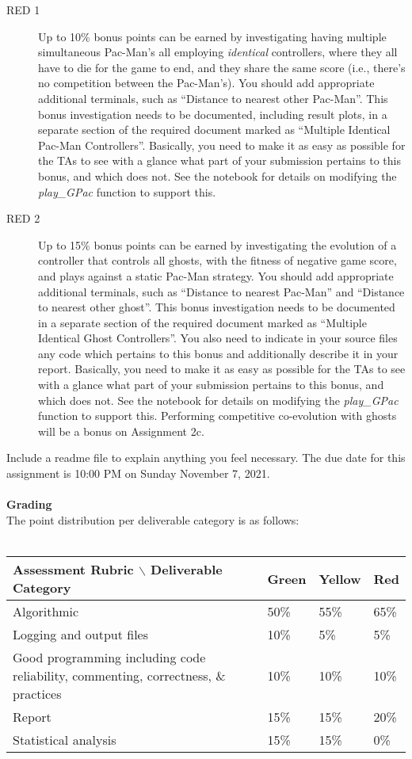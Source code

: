 \documentclass{article}
\begin{document}
\begin{description}
\item[RED 1] Up to 10\% bonus points can be earned by investigating having multiple simultaneous Pac-Man's all employing \emph{identical} controllers, where they all have to die for the game to end, and they share the same score (i.e., there's no competition between the Pac-Man's). You should add appropriate additional terminals, such as ``Distance to nearest other Pac-Man''. This bonus investigation needs to be documented, including result plots, in a separate section of the required document marked as ``Multiple Identical Pac-Man Controllers''. Basically, you need to make it as easy as possible for the TAs to see with a glance what part of your submission pertains to this bonus, and which does not. See the notebook for details on modifying the \emph{play\_GPac} function to support this.
\item[RED 2] Up to 15\% bonus points can be earned by investigating the evolution of a controller that controls all ghosts, with the fitness of negative game score, and plays against a static Pac-Man strategy. You should add appropriate additional terminals, such as ``Distance to nearest Pac-Man'' and ``Distance to nearest other ghost''. This bonus investigation needs to be documented in a separate section of the required document marked as ``Multiple Identical Ghost Controllers''. You also need to indicate in your source files any code which pertains to this bonus and additionally describe it in your report. Basically, you need to make it as easy as possible for the TAs to see with a glance what part of your submission pertains to this bonus, and which does not. See the notebook for details on modifying the \emph{play\_GPac} function to support this. Performing competitive co-evolution with ghosts will be a bonus on Assignment 2c.

\end{description}
Include a readme file to explain anything you feel necessary. The due date for this assignment is 10:00 PM on Sunday November 7, 2021.
\\
\\
\textbf{Grading}\\
The point distribution per deliverable category is as follows: \\
\\
\begin{tabular}{l|l|l|l|}
  Assessment Rubric $\backslash$ Deliverable Category & Green       & Yellow        & Red\\ \hline \hline  
  Algorithmic                                                              & 50\% & 55\% & 65\%\\
  \hline Logging and output files                      & 10\%  & 5\%   & 5\%\\
  \hline Good programming including code reliability, commenting, correctness, \& practices      & 10\%  & 10\% & 10\%\\
  \hline Report    & 15\%  & 15\% & 20\% \\
  \hline Statistical analysis                                          &  15\%   & 15\% &0\%\\
\end{tabular}\\
\end{document}
